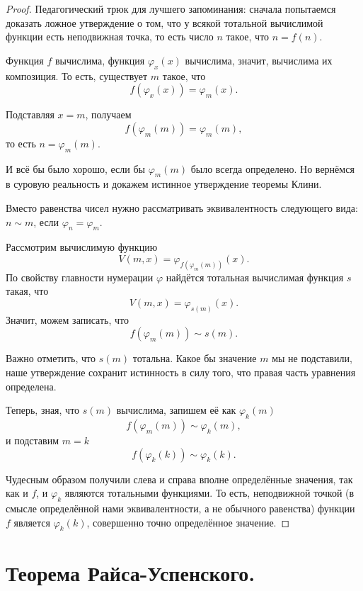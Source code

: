 \documentclass{article}
\begin{document}
    \begin{proof}
        Педагогический трюк для лучшего запоминания: сначала попытаемся доказать ложное утверждение
        о том, что у всякой тотальной вычислимой функции есть неподвижная точка, то есть число $n$
        такое, что $n = f(n)$.

        Функция $f$ вычислима, функция $\varphi_x(x)$ вычислима, значит, вычислима их композиция. То
        есть, существует $m$ такое, что
        $$
            f(\varphi_x(x)) = \varphi_m(x).
        $$

        Подставляя $x = m$, получаем
        $$
            f(\varphi_m(m)) = \varphi_m(m),
        $$
        то есть $n = \varphi_m(m)$.

        И всё бы было хорошо, если бы $\varphi_m(m)$ было всегда определено. Но вернёмся в суровую
        реальность и докажем истинное утверждение теоремы Клини.

        Вместо равенства чисел нужно рассматривать эквивалентность следующего вида: $n \sim m$,
        если $\varphi_n = \varphi_m$.

        Рассмотрим вычислимую функцию $$V(m, x) = \varphi_{f(\varphi_m(m))}(x).$$ По свойству главности
        нумерации $\varphi$ найдётся тотальная вычислимая функция $s$ такая, что $$V(m, x)
        = \varphi_{s(m)}(x).$$ Значит, можем записать, что
        $$
            f(\varphi_m(m)) \sim s(m).
        $$

        Важно отметить, что $s(m)$ тотальна. Какое бы значение $m$ мы не подставили, наше
        утверждение сохранит истинность в силу того, что правая часть уравнения определена.

        Теперь, зная, что $s(m)$ вычислима, запишем её как $\varphi_k(m)$
        $$
            f(\varphi_m(m)) \sim \varphi_k(m),
        $$
        и подставим $m = k$
        $$
            f(\varphi_k(k)) \sim \varphi_k(k).
        $$

        Чудесным образом получили слева и справа вполне определённые значения, так как и $f$,
        и $\varphi_k$ являются тотальными функциями. То есть, неподвижной точкой (в смысле
        определённой нами эквивалентности, а не обычного равенства) функции $f$ является
        $\varphi_k(k)$, совершенно точно определённое значение.
    \end{proof}

    \section{Теорема Райса-Успенского.}
\end{document}
